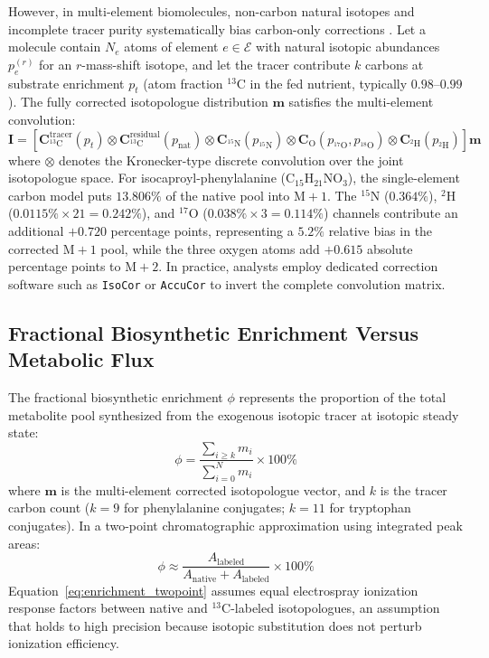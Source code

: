 \documentclass[11pt,twoside,openright]{book}
\begin{document}
However, in multi-element biomolecules, non-carbon natural isotopes and incomplete tracer purity systematically bias carbon-only corrections \cite{millard2012isocor, su2017accucor}. Let a molecule contain $N_e$ atoms of element $e \in \mathcal{E}$ with natural isotopic abundances $p_e^{(r)}$ for an $r$-mass-shift isotope, and let the tracer contribute $k$ carbons at substrate enrichment $p_t$ (atom fraction $^{13}\text{C}$ in the fed nutrient, typically $0.98\text{--}0.99$). The fully corrected isotopologue distribution $\mathbf{m}$ satisfies the multi-element convolution:
\begin{equation}
\mathbf{I} = \left[ \mathbf{C}_{^{13}\text{C}}^{\text{tracer}}(p_t) \otimes \mathbf{C}_{^{13}\text{C}}^{\text{residual}}(p_{\text{nat}}) \otimes \mathbf{C}_{^{15}\text{N}}(p_{^{15}\text{N}}) \otimes \mathbf{C}_{\text{O}}(p_{^{17}\text{O}}, p_{^{18}\text{O}}) \otimes \mathbf{C}_{^{2}\text{H}}(p_{^{2}\text{H}}) \right] \mathbf{m}
\label{eq:multielement_mid}
\end{equation}
where $\otimes$ denotes the Kronecker-type discrete convolution over the joint isotopologue space. For isocaproyl-phenylalanine ($\text{C}_{15}\text{H}_{21}\text{NO}_3$), the single-element carbon model puts $13.806\%$ of the native pool into $\text{M}+1$. The $^{15}\text{N}$ ($0.364\%$), $^{2}\text{H}$ ($0.0115\% \times 21 = 0.242\%$), and $^{17}\text{O}$ ($0.038\% \times 3 = 0.114\%$) channels contribute an additional $+0.720$ percentage points, representing a $5.2\%$ relative bias in the corrected $\text{M}+1$ pool, while the three oxygen atoms add $+0.615$ absolute percentage points to $\text{M}+2$. In practice, analysts employ dedicated correction software such as \texttt{IsoCor} \cite{millard2012isocor} or \texttt{AccuCor} \cite{su2017accucor} to invert the complete convolution matrix.

\subsection{Fractional Biosynthetic Enrichment Versus Metabolic Flux}

The fractional biosynthetic enrichment $\phi$ represents the proportion of the total metabolite pool synthesized from the exogenous isotopic tracer at isotopic steady state:
\begin{equation}
\phi = \frac{\sum_{i \ge k} m_i}{\sum_{i=0}^N m_i} \times 100\%
\label{eq:enrichment_clustersum}
\end{equation}
where $\mathbf{m}$ is the multi-element corrected isotopologue vector, and $k$ is the tracer carbon count ($k = 9$ for phenylalanine conjugates; $k = 11$ for tryptophan conjugates). In a two-point chromatographic approximation using integrated peak areas:
\begin{equation}
\phi \approx \frac{A_{\text{labeled}}}{A_{\text{native}} + A_{\text{labeled}}} \times 100\%
\label{eq:enrichment_twopoint}
\end{equation}
Equation~\eqref{eq:enrichment_twopoint} assumes equal electrospray ionization response factors between native and $^{13}\text{C}$-labeled isotopologues, an assumption that holds to high precision because isotopic substitution does not perturb ionization efficiency.
\end{document}
